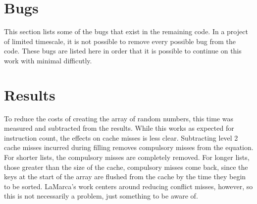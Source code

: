 \section{Bugs}
This section lists some of the bugs that exist in the remaining code. In a
project of limited timescale, it is not possible to remove every possible bug
from the code. These bugs are listed here in order that it is possible to
continue on this work with minimal difficutly.

\section{Results}
\label{bug3}
To reduce the costs of creating the array of random numbers, this time was
measured and subtracted from the results. While this works as expected for
instruction count, the effects on cache misses is less clear. Subtracting level
2 cache misses incurred during filling removes compulsory misses from the
equation. For shorter lists, the compulsory misses are completely removed.
For longer lists, those greater than the size of the cache, compulsory misses
come back, since the keys at the start of the array are flushed from the cache
by the time they begin to be sorted. LaMarca's work centers around
reducing conflict misses, however, so this is not necessarily a problem, just
something to be aware of.
